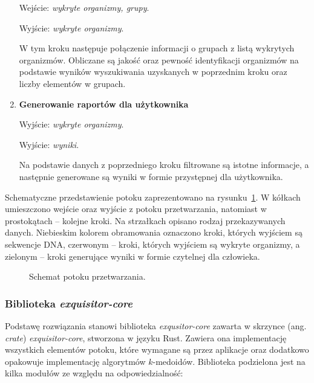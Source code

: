 \begin{enumerate}
{                    Wejście: \textit{wykryte organizmy, grupy}.

                    Wyjście: \textit{wykryte organizmy}.

                    W tym kroku następuje połączenie informacji o grupach z listą wykrytych organizmów. Obliczane są jakość oraz pewność identyfikacji organizmów na podstawie wyników wyszukiwania uzyskanych w poprzednim kroku oraz liczby elementów w grupach.
                }
                \item {
                    \textbf{Generowanie raportów dla użytkownika}

                    Wyjście: \textit{wykryte organizmy}.

                    Wyjście: \textit{wyniki}.

                    Na podstawie danych z poprzedniego kroku filtrowane są istotne informacje, a następnie generowane są wyniki w formie przystępnej dla użytkownika.
                }
            \end{enumerate}

            Schematyczne przedstawienie potoku zaprezentowano na rysunku~\ref{Picture:Pipeline}. W kółkach umieszczono wejście oraz wyjście z potoku przetwarzania, natomiast w prostokątach – kolejne kroki. Na strzałkach opisano rodzaj przekazywanych danych. Niebieskim kolorem obramowania oznaczono kroki, których wyjściem są sekwencje DNA, czerwonym – kroki, których wyjściem są wykryte organizmy, a zielonym – kroki generujące wyniki w formie czytelnej dla człowieka.

            \begin{figure}
                \begin{center}
                    
                \end{center}
                \caption{
                    Schemat potoku przetwarzania.
                }\label{Picture:Pipeline}
            \end{figure}

        \subsubsection{Biblioteka \textit{exquisitor-core}}
            Podstawę rozwiązania stanowi biblioteka \textit{exqusitor-core} zawarta w skrzynce (ang. \textit{crate}) \textit{exquisitor-core}, stworzona w języku Rust. Zawiera ona implementację wszystkich elementów potoku, które wymagane są przez aplikacje oraz dodatkowo opakowuje implementację algorytmów $k$-medoidów. Biblioteka podzielona jest na kilka modułów ze względu na odpowiedzialność:

